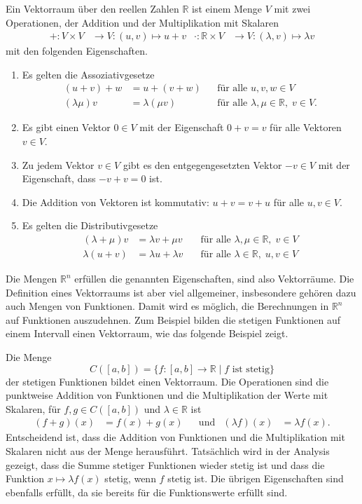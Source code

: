 \begin{definition}[Vektorraum]
Ein Vektorraum über den reellen Zahlen $\mathbb{R}$ ist einem Menge $V$ mit
zwei Operationen, der Addition und der Multiplikation mit Skalaren
\begin{align*}
    +\colon V\times V         &\to V : (u,v)\mapsto u+v
&
\cdot\colon \mathbb{R}\times V&\to V : (\lambda,v) \mapsto\lambda v
\end{align*}
mit den folgenden Eigenschaften.
\begin{enumerate}
\item
Es gelten die Assoziativgesetze
\begin{align*}
(u+v)+w&=u+(v+w)&&\text{für alle $u,v,w\in V$}\\
(\lambda \mu)v&=\lambda(\mu v)&&\text{für alle $\lambda,\mu\in\mathbb{R},\;v\in V$.}
\end{align*}
\item
Es gibt einen Vektor $0\in V$ mit der Eigenschaft $0+v=v$ für alle
Vektoren $v\in V$.
\item
Zu jedem Vektor $v\in V$ gibt es den entgegengesetzten Vektor $-v\in V$
mit der Eigenschaft, dass $-v+v=0$ ist.
\item
Die Addition von Vektoren ist kommutativ: $u+v=v+u$ für alle $u,v\in V$.
\item
Es gelten die Distributivgesetze 
\begin{align*}
(\lambda + \mu) v &= \lambda v + \mu v
	&\quad\text{für alle $\lambda,\mu\in\mathbb{R},\;v\in V$}\\
\lambda(u+v)      &= \lambda u + \lambda v
	&\quad\text{für alle $\lambda\in\mathbb{R},\;u,v\in V$}
\end{align*}
\end{enumerate}
\end{definition}

Die Mengen $\mathbb{R}^n$ erfüllen die genannten Eigenschaften, sind
also Vektorräume.
Die Definition eines Vektorraums ist aber viel allgemeiner, insbesondere
gehören dazu auch Mengen von Funktionen.
Damit wird es möglich, die Berechnungen in $\mathbb{R}^n$ auf Funktionen
auszudehnen.
Zum Beispiel bilden die stetigen Funktionen auf einem Intervall einen
Vektorraum, wie das folgende Beispiel zeigt.

\begin{beispiel}
Die Menge
\[
C([a,b])
=
\{f\colon[a,b]\to\mathbb{R}\mid \text{$f$ ist stetig}\}
\]
der stetigen Funktionen bildet einen Vektorraum.
Die Operationen sind die punktweise Addition von Funktionen und die
Multiplikation der Werte mit Skalaren, für $f,g\in C([a,b])$ und
$\lambda\in \mathbb{R}$ ist
\begin{align*}
(f+g)(x) &= f(x)+g(x)
&&\text{und}&
(\lambda f)(x) &= \lambda f(x).
\end{align*}
Entscheidend ist, dass die Addition von Funktionen und die Multiplikation
mit Skalaren nicht aus der Menge herausführt.
Tatsächlich wird in der Analysis gezeigt, dass die Summe stetiger Funktionen
wieder stetig ist und dass die Funktion $x\mapsto \lambda f(x)$ stetig,
wenn $f$ stetig ist.
Die übrigen Eigenschaften sind ebenfalls erfüllt, da sie bereits für die
Funktionswerte erfüllt sind.
\end{beispiel}

